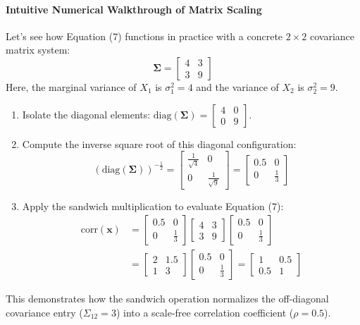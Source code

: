 \documentclass{article}
\begin{document}
\paragraph{Intuitive Numerical Walkthrough of Matrix Scaling}
Let's see how Equation (7) functions in practice with a concrete $2\times2$ covariance matrix system:
\begin{equation*}
\boldsymbol{\Sigma} = \begin{bmatrix} 4 & 3 \\ 3 & 9 \end{bmatrix}
\end{equation*}
Here, the marginal variance of $X_1$ is $\sigma_1^2 = 4$ and the variance of $X_2$ is $\sigma_2^2 = 9$.
\begin{enumerate}
    \item Isolate the diagonal elements: $\text{diag}(\boldsymbol{\Sigma}) = \begin{bmatrix} 4 & 0 \\ 0 & 9 \end{bmatrix}$.
    \item Compute the inverse square root of this diagonal configuration:
    \begin{equation*}
    \left(\text{diag}(\boldsymbol{\Sigma})\right)^{-\frac{1}{2}} = \begin{bmatrix} \frac{1}{\sqrt{4}} & 0 \\ 0 & \frac{1}{\sqrt{9}} \end{bmatrix} = \begin{bmatrix} 0.5 & 0 \\ 0 & \frac{1}{3} \end{bmatrix}
    \end{equation*}
    \item Apply the sandwich multiplication to evaluate Equation (7):
    \begin{align*}
    \text{corr}(\mathbf{x}) &= \begin{bmatrix} 0.5 & 0 \\ 0 & \frac{1}{3} \end{bmatrix} \begin{bmatrix} 4 & 3 \\ 3 & 9 \end{bmatrix} \begin{bmatrix} 0.5 & 0 \\ 0 & \frac{1}{3} \end{bmatrix} \\
    &= \begin{bmatrix} 2 & 1.5 \\ 1 & 3 \end{bmatrix} \begin{bmatrix} 0.5 & 0 \\ 0 & \frac{1}{3} \end{bmatrix} = \begin{bmatrix} 1 & 0.5 \\ 0.5 & 1 \end{bmatrix}
    \end{align*}
\end{enumerate}
This demonstrates how the sandwich operation normalizes the off-diagonal covariance entry ($\Sigma_{12} = 3$) into a scale-free correlation coefficient ($\rho = 0.5$).
\end{document}
